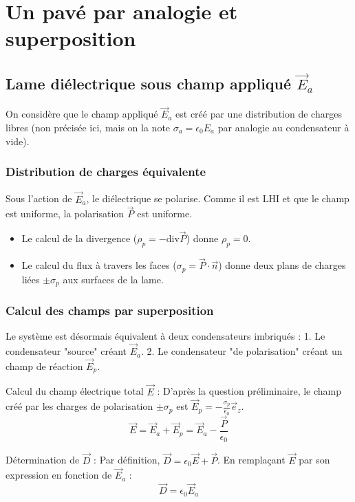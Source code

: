 \documentclass[french]{yLectureNote}
\renewcommand{\vec}{\overrightarrow}
\begin{document}
\section{Un pavé par analogie et superposition}
\subsection{Lame diélectrique sous champ appliqué $\vec{E}_a$}

On considère que le champ appliqué $\vec{E}_a$ est créé par une distribution de charges libres (non précisée ici, mais on la note $\sigma_a = \epsilon_0 E_a$ par analogie au condensateur à vide).

\subsubsection{Distribution de charges équivalente}
Sous l'action de $\vec{E}_a$, le diélectrique se polarise. Comme il est LHI et que le champ est uniforme, la polarisation $\vec{P}$ est uniforme.
\begin{itemize}
    \item Le calcul de la divergence ($\rho_p = -\text{div}\vec{P}$) donne $\rho_p = 0$.
    \item Le calcul du flux à travers les faces ($\sigma_p = \vec{P} \cdot \vec{n}$) donne deux plans de charges liées $\pm \sigma_p$ aux surfaces de la lame.
\end{itemize}

\subsubsection{Calcul des champs par superposition}
Le système est désormais équivalent à deux condensateurs imbriqués :
1.  Le condensateur "source" créant $\vec{E}_a$.
2.  Le condensateur "de polarisation" créant un champ de réaction $\vec{E}_p$.

Calcul du champ électrique total $\vec{E}$ :
D'après la question préliminaire, le champ créé par les charges de polarisation $\pm \sigma_p$ est $\vec{E}_p = -\frac{\sigma_p}{\epsilon_0} \vec{e}_z$.
$$\vec{E} = \vec{E}_a + \vec{E}_p = \vec{E}_a - \frac{\vec{P}}{\epsilon_0}$$

Détermination de $\vec{D}$ :
Par définition, $\vec{D} = \epsilon_0 \vec{E} + \vec{P}$. En remplaçant $\vec{E}$ par son expression en fonction de $\vec{E}_a$ :
$$\vec{D} = \epsilon_0 \vec{E}_a$$
\end{document}
